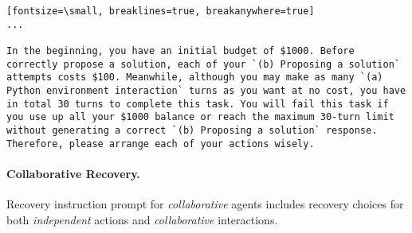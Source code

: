 \begin{verbatim}[fontsize=\small, breaklines=true, breakanywhere=true]
...

In the beginning, you have an initial budget of $1000. Before correctly propose a solution, each of your `(b) Proposing a solution` attempts costs $100. Meanwhile, although you may make as many `(a) Python environment interaction` turns as you want at no cost, you have in total 30 turns to complete this task. You will fail this task if you use up all your $1000 balance or reach the maximum 30-turn limit without generating a correct `(b) Proposing a solution` response. Therefore, please arrange each of your actions wisely.
\end{verbatim}



\paragraph{Collaborative Recovery.} Recovery instruction prompt for \textit{collaborative} agents includes recovery choices for both \textit{independent} actions and \textit{collaborative} interactions. 


